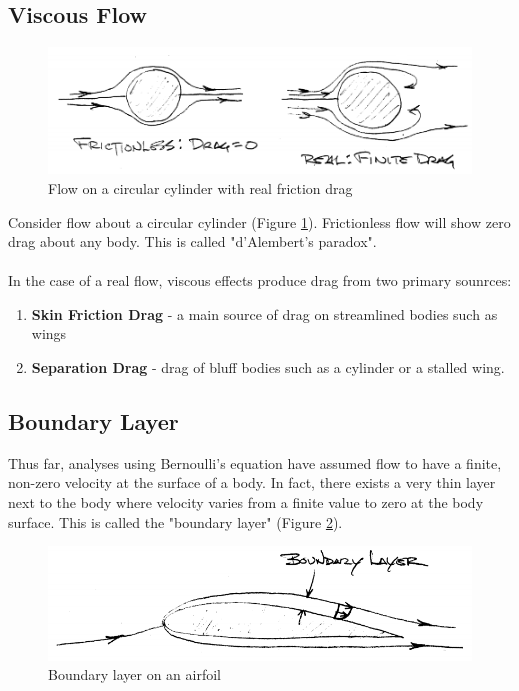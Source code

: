 \documentclass[draft=false, titlepage]{article}
\begin{document}
\subsection{Viscous Flow}
\begin{figure}[ht]
	\centering
	\includegraphics[width=0.8\linewidth]{Figures/p14_frictionDrag.PNG}
	\caption{Flow on a circular cylinder with real friction drag}
	\label{fig:p14_frictionDrag}
\end{figure}
Consider flow about a circular cylinder (Figure \ref{fig:p14_frictionDrag}). Frictionless flow will show zero drag about any body. This is called "d'Alembert's paradox".
\paragraph*{}In the case of a real flow, viscous effects produce drag from two primary sounrces:
\begin{enumerate}
	\item \textbf{Skin Friction Drag}  - a main source of drag on streamlined bodies such as wings
	\item \textbf{Separation Drag} - drag of bluff bodies such as a cylinder or a stalled wing.
\end{enumerate}

\subsection{Boundary Layer}
Thus far, analyses using Bernoulli's equation have assumed flow to have a finite, non-zero velocity at the surface of a body. In fact, there exists a very thin layer next to the body where velocity varies from a finite value to zero at the body surface. This is called the "boundary layer" (Figure \ref{fig:p15_boundaryLayer}).
\begin{figure}[ht]
	\centering
	\includegraphics[width=0.5\linewidth]{Figures/p15_boundaryLayer.PNG}
	\caption{Boundary layer on an airfoil}
	\label{fig:p15_boundaryLayer}
\end{figure}
\end{document}
